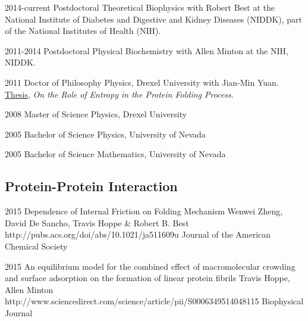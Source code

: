 \documentclass[]{scrartcl}
\begin{document}
\begin{cleanCV}


\WorkExperience
{2014-current}
{Postdoctoral}
{
Theoretical Biophysics with Robert Best at the
National Institute of Diabetes and Digestive and Kidney Diseases (NIDDK), 
part of the National Institutes of Health (NIH).
}

\WorkExperience
{2011-2014}
{Postdoctoral}
{
Physical Biochemistry with Allen Minton at the NIH, NIDDK.
}


\WorkExperience
{2011}
{Doctor of Philosophy}
{
Physics, Drexel University with Jian-Min Yuan. 
\href{https://idea.library.drexel.edu/islandora/object/idea:3488}{Thesis},
\emph{On the Role of Entropy in the Protein Folding Process}.
}

\WorkExperience
{2008}
{Master of Science}
{Physics, Drexel University}

\WorkExperience
{2005}
{Bachelor of Science}
{Physics, University of Nevada}

\WorkExperience
{2005}
{Bachelor of Science}
{Mathematics, University of Nevada}


%
%


\subsection{Protein-Protein Interaction}

\Paper
{2015}
{Dependence of Internal Friction on Folding Mechanism}
{Wenwei Zheng, David De Sancho, Travis Hoppe \& Robert B. Best}
{http://pubs.acs.org/doi/abs/10.1021/ja511609u}
{Journal of the American Chemical Society}

\Paper
{2015}
{An equilibrium model for the combined effect of macromolecular crowding and surface adsorption on the formation of linear protein fibrils}
{Travis Hoppe, Allen Minton}
{http://www.sciencedirect.com/science/article/pii/S0006349514048115}
{Biophysical Journal}


\end{cleanCV}
\end{document}
